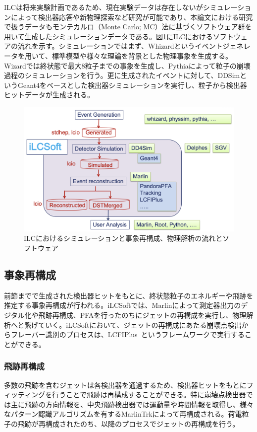 ILCは将来実験計画であるため、現在実験データは存在しないがシミュレーションによって検出器応答や新物理探索など研究が可能であり、本論文における研究で扱うデータもモンテカルロ（Monte Carlo; MC）法に基づくソフトウェア群を用いて生成したシミュレーションデータである。図\ref{ilcsoft}にILCにおけるソフトウェアの流れを示す。シミュレーションではまず、Whizardというイベントジェネレータを用いて、標準模型や様々な理論を背景とした物理事象を生成する。Wizardでは終状態で最大8粒子までの事象を生成し、Pythiaによって粒子の崩壊過程のシミュレーションを行う。更に生成されたイベントに対して、DDSimというGeant4をベースとした検出器シミュレーションを実行し、粒子から検出器ヒットデータが生成される。
\begin{figure}[h]
	\begin{center}
 \includegraphics[keepaspectratio, scale=0.25]
 	{Figure/Introduction/ilcsoft.png}
 		\caption {ILCにおけるシミュレーションと事象再構成、物理解析の流れとソフトウェア}
 		\label{ilcsoft}
	\end{center}
\end{figure}

\subsection{事象再構成}
前節までで生成された検出器ヒットをもとに、終状態粒子のエネルギーや飛跡を推定する事象再構成が行われる。iLCSoftでは、Marlinによって測定器出力のデジタル化や飛跡再構成、PFAを行ったのちにジェットの再構成を実行し、物理解析へと繋げていく。iLCSoftにおいて、ジェットの再構成にあたる崩壊点検出からフレーバー識別のプロセスは、LCFIPlus~\cite{lcfiplus}というフレームワークで実行することができる。

\subsubsection{飛跡再構成}
多数の飛跡を含むジェットは各検出器を通過するため、検出器ヒットをもとにフィッティングを行うことで飛跡は再構成することができる。特に崩壊点検出器では主に飛跡の方向情報を、中央飛跡検出器では運動量や時間情報を取得し、様々なパターン認識アルゴリズムを有するMarlinTrkによって再構成される。荷電粒子の飛跡が再構成されたのち、以降のプロセスでジェットの再構成を行う。

